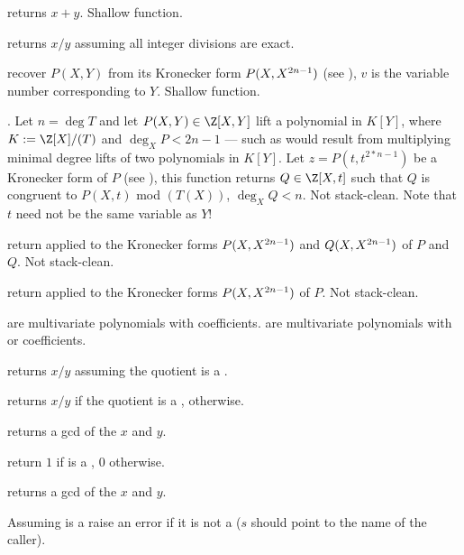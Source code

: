  returns $x+y$. Shallow function.

 returns $x/y$ assuming all integer
divisions are exact.

 recover $P(X,Y)$
from its Kronecker form $P(X,X^{2\*n-1})$ (see ),
$v$ is the variable number corresponding to $Y$. Shallow function.

. Let $n = \deg T$ and let
$P(X,Y)\in \Z[X,Y]$ lift a polynomial in $K[Y]$, where $K := \Z[X]/(T)$ and
$\deg_X P < 2n-1$ --- such as would result from multiplying minimal degree
lifts of two polynomials in $K[Y]$. Let $z = P(t,t^{2*n-1})$ be a Kronecker
form of $P$ (see ), this function returns $Q\in
\Z[X,t]$ such that $Q$ is congruent to $P(X,t)$ mod $(T(X))$, $\deg_X Q <
n$. Not stack-clean. Note that $t$ need not be the same variable as $Y$!

 return 
applied to the Kronecker forms $P(X,X^{2\*n-1})$ and $Q(X,X^{2\*n-1})$
of $P$ and $Q$. Not stack-clean.

 return 
applied to the Kronecker forms $P(X,X^{2\*n-1})$
of $P$. Not stack-clean.

 are multivariate polynomials with  coefficients.
 are multivariate polynomials with  or  coefficients.

 returns $x/y$ assuming the quotient is a .

 returns $x/y$ if the quotient is a
,  otherwise.

 returns a gcd of the  $x$ and $y$.

 return $1$ if  is a , $0$ otherwise.

 returns a gcd of the  $x$ and $y$.


 Assuming  is a 
raise an error if it is not a  ($s$ should point to the name of the
caller).


